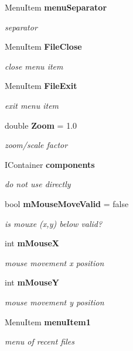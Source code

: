 \begin{CompactItemize}
Menu\-Item {\bf menu\-Separator}
\begin{CompactList}\small\item\em separator \item\end{CompactList}\item 
Menu\-Item {\bf File\-Close}
\begin{CompactList}\small\item\em close menu item \item\end{CompactList}\item 
Menu\-Item {\bf File\-Exit}
\begin{CompactList}\small\item\em exit menu item \item\end{CompactList}\item 
double {\bf Zoom} = 1.0
\begin{CompactList}\small\item\em zoom/scale factor \item\end{CompactList}\item 
IContainer {\bf components}
\begin{CompactList}\small\item\em do not use directly \item\end{CompactList}\item 
bool {\bf m\-Mouse\-Move\-Valid} = false
\begin{CompactList}\small\item\em is mouxe (x,y) below valid? \item\end{CompactList}\item 
int {\bf m\-Mouse\-X}
\begin{CompactList}\small\item\em mouse movement x position \item\end{CompactList}\item 
int {\bf m\-Mouse\-Y}
\begin{CompactList}\small\item\em mouse movement y position \item\end{CompactList}\item 
Menu\-Item {\bf menu\-Item1}
\begin{CompactList}\small\item\em menu of recent files \item\end{CompactList}\item 

\end{CompactItemize}
